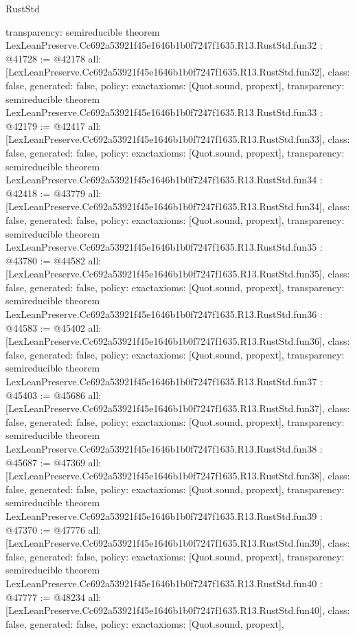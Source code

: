 \begin{lexlean}{RustStd}
\begin{coremodule}
{  transparency: semireducible
}
theorem LexLeanPreserve.Cc692a53921f45e1646b1b0f7247f1635.R13.RustStd.fun32 : @41728 := @42178 {
  all: [LexLeanPreserve.Cc692a53921f45e1646b1b0f7247f1635.R13.RustStd.fun32],
  class: false,
  generated: false,
  policy: exact{axioms: [Quot.sound, propext]},
  transparency: semireducible
}
theorem LexLeanPreserve.Cc692a53921f45e1646b1b0f7247f1635.R13.RustStd.fun33 : @42179 := @42417 {
  all: [LexLeanPreserve.Cc692a53921f45e1646b1b0f7247f1635.R13.RustStd.fun33],
  class: false,
  generated: false,
  policy: exact{axioms: [Quot.sound, propext]},
  transparency: semireducible
}
theorem LexLeanPreserve.Cc692a53921f45e1646b1b0f7247f1635.R13.RustStd.fun34 : @42418 := @43779 {
  all: [LexLeanPreserve.Cc692a53921f45e1646b1b0f7247f1635.R13.RustStd.fun34],
  class: false,
  generated: false,
  policy: exact{axioms: [Quot.sound, propext]},
  transparency: semireducible
}
theorem LexLeanPreserve.Cc692a53921f45e1646b1b0f7247f1635.R13.RustStd.fun35 : @43780 := @44582 {
  all: [LexLeanPreserve.Cc692a53921f45e1646b1b0f7247f1635.R13.RustStd.fun35],
  class: false,
  generated: false,
  policy: exact{axioms: [Quot.sound, propext]},
  transparency: semireducible
}
theorem LexLeanPreserve.Cc692a53921f45e1646b1b0f7247f1635.R13.RustStd.fun36 : @44583 := @45402 {
  all: [LexLeanPreserve.Cc692a53921f45e1646b1b0f7247f1635.R13.RustStd.fun36],
  class: false,
  generated: false,
  policy: exact{axioms: [Quot.sound, propext]},
  transparency: semireducible
}
theorem LexLeanPreserve.Cc692a53921f45e1646b1b0f7247f1635.R13.RustStd.fun37 : @45403 := @45686 {
  all: [LexLeanPreserve.Cc692a53921f45e1646b1b0f7247f1635.R13.RustStd.fun37],
  class: false,
  generated: false,
  policy: exact{axioms: [Quot.sound, propext]},
  transparency: semireducible
}
theorem LexLeanPreserve.Cc692a53921f45e1646b1b0f7247f1635.R13.RustStd.fun38 : @45687 := @47369 {
  all: [LexLeanPreserve.Cc692a53921f45e1646b1b0f7247f1635.R13.RustStd.fun38],
  class: false,
  generated: false,
  policy: exact{axioms: [Quot.sound, propext]},
  transparency: semireducible
}
theorem LexLeanPreserve.Cc692a53921f45e1646b1b0f7247f1635.R13.RustStd.fun39 : @47370 := @47776 {
  all: [LexLeanPreserve.Cc692a53921f45e1646b1b0f7247f1635.R13.RustStd.fun39],
  class: false,
  generated: false,
  policy: exact{axioms: [Quot.sound, propext]},
  transparency: semireducible
}
theorem LexLeanPreserve.Cc692a53921f45e1646b1b0f7247f1635.R13.RustStd.fun40 : @47777 := @48234 {
  all: [LexLeanPreserve.Cc692a53921f45e1646b1b0f7247f1635.R13.RustStd.fun40],
  class: false,
  generated: false,
  policy: exact{axioms: [Quot.sound, propext]},
}
\end{coremodule}
\end{lexlean}
